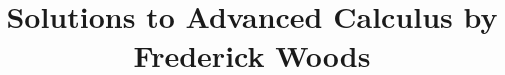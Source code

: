 \documentclass[10pt]{article}
\begin{document}
\title{Solutions to Advanced Calculus by Frederick Woods}

\maketitle


\end{document}
